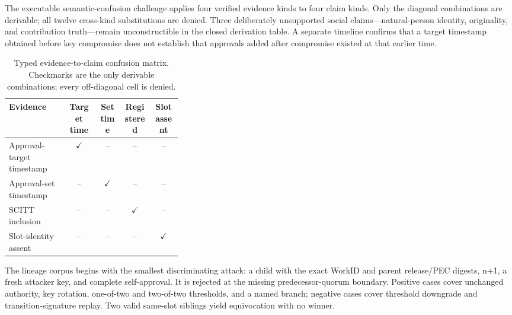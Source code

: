 \documentclass[11pt]{article}
\begin{document}
The executable semantic-confusion challenge applies four verified evidence
kinds to four claim kinds. Only the diagonal combinations are derivable; all
twelve cross-kind substitutions are denied. Three deliberately unsupported
social claims---natural-person identity, originality, and contribution
truth---remain unconstructible in the closed derivation table. A separate
timeline confirms that a target timestamp obtained before key compromise does
not establish that approvals added after compromise existed at that earlier
time.

\begin{table}[H]
\centering
\caption{Typed evidence-to-claim confusion matrix. Checkmarks are the only
derivable combinations; every off-diagonal cell is denied.}
\begin{tabular}{p{0.34\linewidth}cccc}
\toprule
Evidence & Target time & Set time & Registered & Slot assent \\
\midrule
Approval-target timestamp & $\checkmark$ & -- & -- & -- \\
Approval-set timestamp & -- & $\checkmark$ & -- & -- \\
SCITT inclusion & -- & -- & $\checkmark$ & -- \\
Slot-identity assent & -- & -- & -- & $\checkmark$ \\
\bottomrule
\end{tabular}
\end{table}

The lineage corpus begins with the smallest discriminating attack: a child
with the exact WorkID and parent release/PEC digests, n+1, a fresh attacker
key, and complete self-approval. It is rejected at the missing
predecessor-quorum boundary. Positive cases cover unchanged authority, key
rotation, one-of-two and two-of-two thresholds, and a named branch; negative
cases cover threshold downgrade and transition-signature replay. Two valid
same-slot siblings yield equivocation with no winner.
\end{document}
